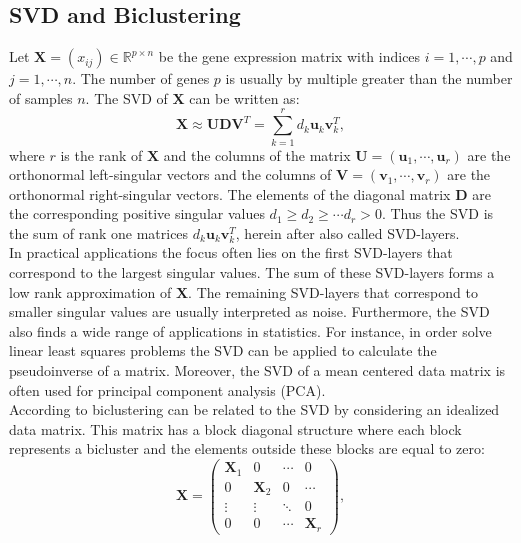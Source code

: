 \subsection{SVD and Biclustering}
Let $\mathbf{X}=(x_{ij}) \in \mathbb{R}^{p \times n}$  be the gene expression matrix with indices $i=1,\cdots,p$ and $j=1,\cdots,n$. The number of genes $p$ is usually by multiple greater than the number of samples $n$. The SVD of $\mathbf{X}$ can be written as:
\begin{equation}
 \mathbf{X} \approx \mathbf{U}\mathbf{D}\mathbf{V}^{T} = \sum_{k=1}^{r}d_{k}\mathbf{u}_{k}\mathbf{v}_{k}^{T},
\end{equation}
where $r$ is the rank of $\mathbf{X}$ and the columns of the matrix $\mathbf{U}=(\mathbf{u}_{1},\cdots,\mathbf{u}_{r})$ are the orthonormal left-singular vectors and the columns of $\mathbf{V}=(\mathbf{v}_{1},\cdots,\mathbf{v}_{r})$ are the orthonormal right-singular vectors. The elements of the diagonal matrix $\mathbf{D}$ are the corresponding positive singular values $d_{1} \geq d_{2} \geq \cdots d_{r} > 0$. 
Thus the SVD is the sum of rank one matrices $d_{k}\mathbf{u}_{k}\mathbf{v}_{k}^{T}$, herein after also called SVD-layers.\\
In practical applications the focus often lies on the first SVD-layers that correspond to the largest singular values. The sum of these SVD-layers forms a low rank approximation of $\mathbf{X}$. The remaining SVD-layers that correspond to smaller singular values are usually interpreted as noise. 
Furthermore, the SVD also finds a wide range of applications in statistics. For instance, in order solve linear least squares problems the SVD can be applied to calculate the pseudoinverse of a matrix. Moreover, the SVD of a mean centered data matrix is often used for principal component analysis (PCA).
\\
According to \citet{Busygin2008} biclustering can be related to the SVD by considering an idealized data matrix. This matrix has a block diagonal structure where each block represents a bicluster and the elements outside these blocks are equal to zero:
\begin{equation}
\mathbf{X}=
\begin{pmatrix} 
\mathbf{X}_{1} & 0 & \cdots & 0\\
0 & \mathbf{X}_{2} & 0 & \cdots \\
\vdots  & \vdots  & \ddots  & 0 \\
0 & 0 & \cdots & \mathbf{X}_{r}
\end{pmatrix},
\end{equation}
